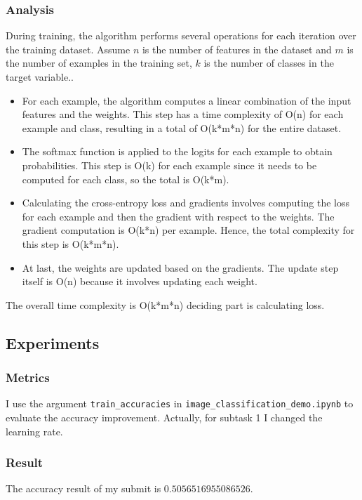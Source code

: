 \documentclass{article}
\begin{document}
\subsubsection{Analysis}

During training, the algorithm performs several operations for each iteration over the training dataset. Assume $n$ is the number of features in the dataset and $m$ is the number of examples in the training set, $k$ is the number of classes in the target variable..

\begin{itemize}
    \item For each example, the algorithm computes a linear combination of the input features and the weights. This step has a time complexity of O(n) for each example and class, resulting in a total of O(k*m*n) for the entire dataset.
    \item The softmax function is applied to the logits for each example to obtain probabilities.  This step is O(k) for each example since it needs to be computed for each class, so the total is O(k*m).
    \item Calculating the cross-entropy loss and gradients involves computing the loss for each example and then the gradient with respect to the weights. The gradient computation is O(k*n) per example. Hence, the total complexity for this step is O(k*m*n).
    \item At last, the weights are updated based on the gradients. The update step itself is O(n) because it involves updating each weight.
\end{itemize}

The overall time complexity is O(k*m*n) deciding part is calculating loss.


\subsection{Experiments}
\subsubsection{Metrics}
I use the argument \texttt{train\_accuracies} in \texttt{image\_classification\_demo.ipynb} to evaluate the accuracy improvement. Actually, for subtask 1 I changed the learning rate.

\subsubsection{Result}
The accuracy result of my submit is $0.5056516955086526$.
\end{document}
